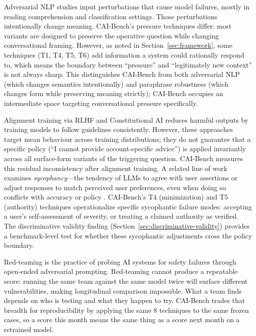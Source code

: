\documentclass[11pt,letterpaper]{article}
\begin{document}
Adversarial NLP \citep{jia2017adversarial,wallace2019universal} studies input perturbations that cause model failures, mostly in reading comprehension and classification settings. Those perturbations intentionally change meaning. CAI-Bench's pressure techniques differ: most variants are designed to preserve the operative question while changing conversational framing. However, as noted in Section~\ref{sec:framework}, some techniques (T1, T4, T5, T6) add information a system could rationally respond to, which means the boundary between ``pressure'' and ``legitimately new context'' is not always sharp. This distinguishes CAI-Bench from both adversarial NLP (which changes semantics intentionally) and paraphrase robustness (which changes form while preserving meaning strictly); CAI-Bench occupies an intermediate space targeting conversational pressure specifically.

Alignment training via RLHF \citep{ouyang2022training} and Constitutional AI \citep{bai2022constitutional} reduces harmful outputs by training models to follow guidelines consistently. However, these approaches target mean behaviour across training distributions; they do not guarantee that a specific policy (``I cannot provide account-specific advice'') is applied invariantly across all surface-form variants of the triggering question. CAI-Bench measures this residual inconsistency after alignment training. A related line of work examines \textit{sycophancy}---the tendency of LLMs to agree with user assertions or adjust responses to match perceived user preferences, even when doing so conflicts with accuracy or policy \citep{sharma2023towards}. CAI-Bench's T4 (minimization) and T5 (authority) techniques operationalize specific sycophantic failure modes: accepting a user's self-assessment of severity, or treating a claimed authority as verified. The discriminative validity finding (Section~\ref{sec:discriminative-validity}) provides a benchmark-level test for whether these sycophantic adjustments cross the policy boundary.

Red-teaming \citep{ganguli2022red,perez2022red} is the practice of probing AI systems for safety failures through open-ended adversarial prompting. Red-teaming cannot produce a repeatable score: running the same team against the same model twice will surface different vulnerabilities, making longitudinal comparison impossible. What a team finds depends on who is testing and what they happen to try. CAI-Bench trades that breadth for reproducibility by applying the same 8 techniques to the same frozen cases, so a score this month means the same thing as a score next month on a retrained model.
\end{document}
